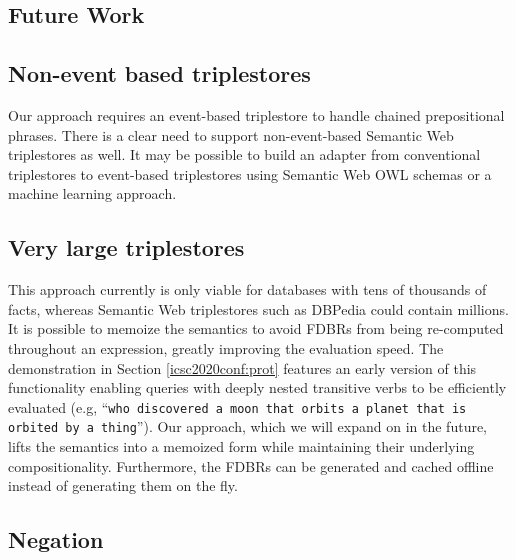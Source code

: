 \documentclass[../main.tex]{subfiles}
\begin{document}
\begin{refsection}


\section{Future Work}

\subsection{Non-event based triplestores}

Our approach requires an event-based triplestore to handle chained prepositional phrases. There is a clear need to support non-event-based Semantic Web triplestores as well. It may be possible to build an adapter from conventional triplestores to event-based triplestores using Semantic Web OWL schemas or a machine learning approach.

\subsection{Very large triplestores}

This approach currently is only viable for databases with tens of thousands of facts, whereas Semantic Web triplestores such as DBPedia \cite{dbpedia} could contain millions.  It is possible to memoize the semantics to avoid FDBRs from being re-computed throughout an expression, greatly improving the evaluation speed.  The demonstration in Section \ref{icsc2020conf:prot} features an early version of this functionality enabling queries with deeply nested transitive verbs to be efficiently evaluated (e.g, ``\texttt{who discovered a moon that orbits a planet that is orbited by a thing}'').  Our approach, which we will expand on in the future, lifts the semantics into a memoized form while maintaining their underlying compositionality.  Furthermore, the FDBRs can be generated and cached offline instead of generating them on the fly.

\subsection{Negation}


\end{refsection}
\end{document}
